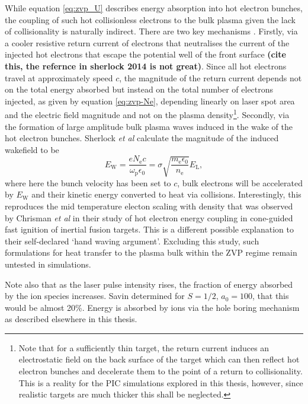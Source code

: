While equation \ref{eq:zvp_U} describes energy absorption into hot electron bunches, the coupling of such hot collisionless electrons to the bulk plasma given the lack of collisionality is naturally indirect. There are two key mechanisms \cite{sherlockIndepthPlasmawaveHeating2014}. Firstly, via a cooler resistive return current of electrons that neutralises the current of the injected hot electrons that escape the potential well of the front surface\textbf{ (cite this, the refernce in sherlock 2014 is not great)}. Since all hot electrons travel at approximately speed $c$, the magnitude of the return current depends not on the total energy absorbed but instead on the total number of electrons injected, as given by equation \ref{eq:zvp-Ne}, depending linearly on laser spot area and the electric field magnitude and not on the plasma density\footnote{Note that for a sufficiently thin target, the return current induces an electrostatic field on the back surface of the target which can then reflect hot electron bunches and decelerate them to the point of a return to collisionality. This is a reality for the PIC simulations explored in this thesis, however, since realistic targets are much thicker this shall be neglected.}. Secondly, via the formation of large amplitude bulk plasma waves induced in the wake of the hot electron bunches. Sherlock \textit{et al} \cite{sherlockIndepthPlasmawaveHeating2014} calculate the magnitude of the induced wakefield to be
\begin{equation}
	E_\mathrm{W} = \frac{eN_\mathrm{e}c}{\omega_\mathrm{p}\epsilon_0} = \sigma \sqrt{\frac{m_\mathrm{e}\epsilon_0}{n_\mathrm{e}}}E_\mathrm{L},
\end{equation}where here the bunch velocity has been set to $c$, bulk electrons will be accelerated by $E_\mathrm{W}$ and their kinetic energy converted to heat via collisions. Interestingly, this reproduces the mid temperature electon scaling with density that was observed by Chrisman \textit{et al} \cite{chrismanIntensityScalingHot2008} in their study of hot electron energy coupling in cone-guided fast ignition of inertial fusion targets. This is a different possible explanation to their self-declared `hand waving argument'. Excluding this study, such formulations for heat transfer to the plasma bulk within the ZVP regime remain untested in simulations.

Note also that as the laser pulse intensity rises, the fraction of energy absorbed by the ion species increases. Savin \cite{savinModellingLaserPlasmaInteractions2019} determined for $S=1/2$, $a_0 = 100$, that this would be almost 20\%. Energy is absorbed by ions via the hole boring mechanism as described elsewhere in this thesis.


